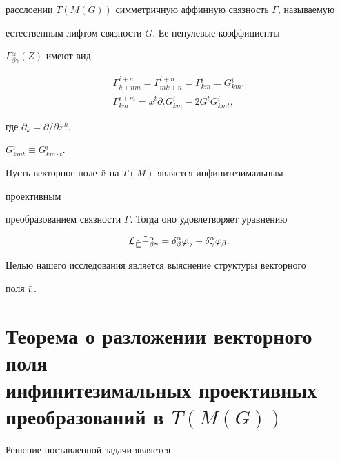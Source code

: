 расслоении $T(M(G))$ симметричную аффинную связность $\Gamma$, называемую 


естественным лифтом связности $G$. Ее ненулевые коэффициенты 


$\Gamma{}^\alpha_{\beta\gamma}(Z)$ имеют вид 


\begin{gather*} 


\Gamma{}^{i+n}_{k+nm}=\Gamma{}^{i+n}_{mk+n}=\Gamma{}^i_{km} 


=G{}^i_{km},\\ 


\Gamma{}^{i+m}_{km}=\Dot x^t\partial_tG{}^i_{km}- 


2G^tG{}^i_{kmt}, 


\end{gather*} 


где $\partial_k=\partial/\partial x^k$, 


$G{}^i_{kmt}\equiv G{}^i_{km\cdot t}$. 


 


Пусть векторное поле $\Tilde v$ на $T(M)$ является инфинитезимальным 


проективным 


преобразованием связности $\Gamma$. Тогда оно удовлетворяет уравнению 


\begin{equation} 


\cal L_{\Tilde v}\Tilde\Gamma{}^\alpha_{\beta\gamma} 


=\delta{}^\alpha_\beta\varphi_\gamma+ 


\delta{}^\alpha_\gamma\varphi_\beta. 


\end{equation} 


Целью нашего исследования является выяснение структуры векторного 


поля $\Tilde v$. 


 


\section{Теорема о разложении векторного поля\protect\\ 


инфинитезимальных проективных преобразований в $T(M(G))$} 


 


Решение поставленной задачи является 


